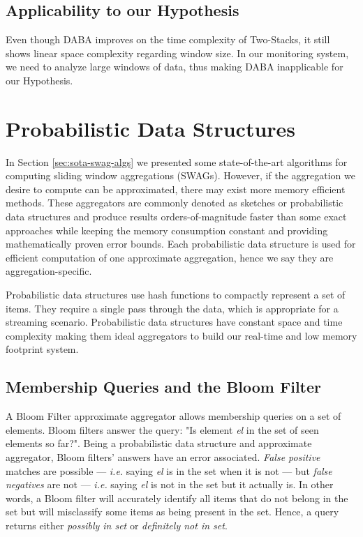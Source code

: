 \subsection*{Applicability to our Hypothesis}
Even though DABA improves on the time complexity of Two-Stacks, it still shows linear space complexity regarding window size. In our monitoring system, we need to analyze large windows of data, thus making DABA inapplicable for our Hypothesis.


\section{Probabilistic Data Structures} \label{sec:pds}
In Section \ref{sec:sota-swag-algs} we presented some state-of-the-art algorithms for computing sliding window aggregations (SWAGs). However, if the aggregation we desire to compute can be approximated, there may exist more memory efficient methods. These aggregators are commonly denoted as sketches or probabilistic data structures and produce results orders-of-magnitude faster than some exact approaches while keeping the memory consumption constant and providing mathematically proven error bounds. Each probabilistic data structure is used for efficient computation of one approximate aggregation, hence we say they are aggregation-specific.

Probabilistic data structures use hash functions to compactly represent a set of items. They require a single pass through the data, which is appropriate for a streaming scenario. Probabilistic data structures have constant space and time complexity \cite{Singh-PDS-BIGD} making them ideal aggregators to build our real-time and low memory footprint system. 

\subsection{Membership Queries and the Bloom Filter} \label{sec:bloom}
A Bloom Filter \cite{BLOOM-BLOOMFILTER} approximate aggregator allows membership queries on a set of elements. Bloom filters answer the query: "Is element \textit{el} in the set of seen elements so far?". Being a probabilistic data structure and approximate aggregator, Bloom filters' answers have an error associated. \textit{False positive} matches are possible --- \textit{i.e.} saying \textit{el} is in the set when it is not --- but \textit{false negatives} are not --- \textit{i.e.} saying \textit{el} is not in the set but it actually is. In other words, a Bloom filter will accurately identify all items that do not belong in the set but will misclassify some items as being present in the set. Hence, a query returns either \textit{possibly in set} or \textit{definitely not in set}.

